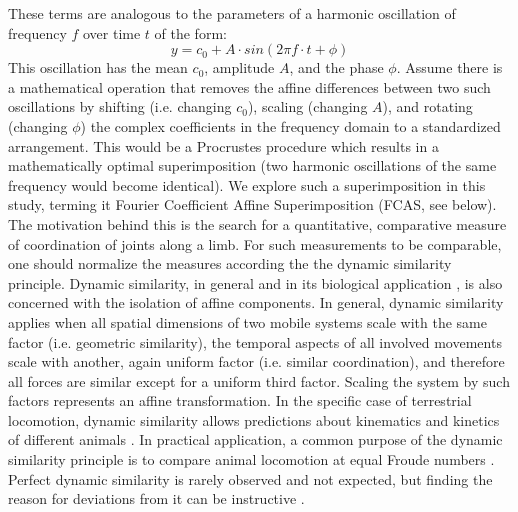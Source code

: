 \documentclass[10pt, a4paper]{article}
\begin{document}
\begin{linenumbers}[1]
These terms are analogous to the parameters of a harmonic oscillation of frequency $f$ over time $t$ of the form: 
\begin{equation*}
y = c_0 + A\cdot sin(2\pi f\cdot t + \phi)
\end{equation*}
This oscillation has the mean $c_0$, amplitude $A$, and the phase $\phi$. 
Assume there is a mathematical operation that removes the affine differences between two such oscillations by shifting (i.e. changing $c_0$), scaling (changing $A$), and rotating (changing $\phi$) the complex coefficients in the frequency domain to a standardized arrangement. 
This would be a Procrustes procedure which results in a mathematically optimal superimposition (two harmonic oscillations of the same frequency would become identical).  
We explore such a superimposition in this study, terming it Fourier Coefficient Affine Superimposition (FCAS, see below). 
\\The motivation behind this is the search for a quantitative, comparative measure of coordination of joints along a limb. 
For such measurements to be comparable, one should normalize the measures according the the dynamic similarity principle. 
Dynamic similarity, in general and in its biological application \citep[\textit{cf.}][]{Alexander1983,Vaughan2005}, is also concerned with the isolation of affine components. 
In general, dynamic similarity applies when all spatial dimensions of two mobile systems scale with the same factor (i.e. geometric similarity), the temporal aspects of all involved movements scale with another, again uniform factor (i.e. similar coordination), and therefore all forces are similar except for a uniform third factor. 
Scaling the system by such factors represents an affine transformation. 
In the specific case of terrestrial locomotion, dynamic similarity allows predictions about kinematics and kinetics of different animals \citep[i.e. about leg phasing, relative stride length, duty factors, forces and power output;][]{Alexander1983}.
In practical application, a common purpose of the dynamic similarity principle is to compare animal locomotion at equal Froude numbers \citep[e.g.][]{SteudelNumbers2006,Holmes2006}. 
Perfect dynamic similarity is rarely observed and not expected, but finding the reason for deviations from it can be instructive \citep[e.g.][]{SteudelNumbers2006,Raichlen2013,Kramer2013}. 

\end{linenumbers}
\end{document}
